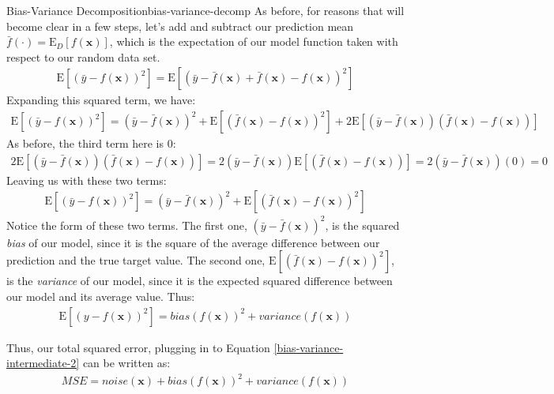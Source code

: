 \begin{derivation}{Bias-Variance Decomposition}{bias-variance-decomp}
    As before, for reasons that will become clear in a few steps, let's add and subtract our prediction mean $\bar{f}(\cdot) = \mathrm{E}_{D}[f(\textbf{x})]$, which is the expectation of our model function taken with respect to our random data set.
    \begin{align*}
        \mathrm{E}[(\bar{y} - f(\textbf{x}))^{2}] = \mathrm{E}[(\bar{y} - \bar{f}(\textbf{x}) + \bar{f}(\textbf{x}) - f(\textbf{x}))^{2}]
    \end{align*}
    Expanding this squared term, we have:
    \begin{align*}
        \mathrm{E}[(\bar{y} - f(\textbf{x}))^{2}] = (\bar{y} - \bar{f}(\textbf{x}))^{2} + \mathrm{E}[(\bar{f}(\textbf{x}) - f(\textbf{x}))^{2}] + 2\mathrm{E}[(\bar{y} - \bar{f}(\textbf{x}))(\bar{f}(\textbf{x}) - f(\textbf{x}))]
    \end{align*}
    As before, the third term here is 0:
    \begin{align*}
        2\mathrm{E}[(\bar{y} - \bar{f}(\textbf{x}))(\bar{f}(\textbf{x}) - f(\textbf{x}))] = 2(\bar{y} - \bar{f}(\textbf{x}))\mathrm{E}[(\bar{f}(\textbf{x}) - f(\textbf{x}))] = 2(\bar{y} - \bar{f}(\textbf{x}))(0) = 0
    \end{align*}
    Leaving us with these two terms:
    \begin{align*}
        \mathrm{E}[(\bar{y} - f(\textbf{x}))^{2}] = (\bar{y} - \bar{f}(\textbf{x}))^{2} + \mathrm{E}[(\bar{f}(\textbf{x}) - f(\textbf{x}))^{2}]
    \end{align*}
    Notice the form of these two terms. The first one, $(\bar{y} - \bar{f}(\textbf{x}))^{2}$, is the squared \textit{bias} of our model, since it is the square of the average difference between our prediction and the true target value. The second one, $\mathrm{E}[(\bar{f}(\textbf{x}) - f(\textbf{x}))^{2}]$, is the \textit{variance} of our model, since it is the expected squared difference between our model and its average value. Thus:
    \begin{align*}
        \mathrm{E}[(y - f(\textbf{x}))^{2}] = \textit{bias}(f(\textbf{x}))^{2} + \textit{variance}(f(\textbf{x}))
    \end{align*}

    Thus, our total squared error, plugging in to Equation \ref{bias-variance-intermediate-2} can be written as:
    \begin{align*}
        \boxed{\textit{MSE} = \textit{noise}(\textbf{x}) + \textit{bias}(f(\textbf{x}))^{2} + \textit{variance}(f(\textbf{x}))}
    \end{align*}
\end{derivation}

